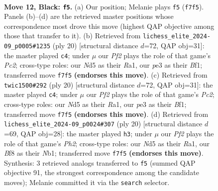 \documentclass[11pt]{article}
\begin{document}
\clearpage

\begin{figure}[p]\centering
\begin{subfigure}{0.46\textwidth}\centering
\resizebox{\linewidth}{!}{%
\newchessgame
\chessboard[
  setfen={r1bk1b1r/ppq2ppp/2p1p3/3nN3/3P4/1Q1BP3/PP3PPP/R1B1K2R b KQ - 5 12},
  showmover=false,
  pgfstyle=straightmove, color=movearrow, markmove={f7-f5}
]}
\caption{}
\end{subfigure}\hfill
\begin{subfigure}{0.46\textwidth}\centering
\resizebox{\linewidth}{!}{%
\newchessgame
\chessboard[
  setfen={r1b1k2r/p2pbppp/1qp1p3/3nP3/4NP2/P7/1PP3PP/R1BQKB1R w KQkq - 1 11},
  showmover=false,
  pgfstyle=straightmove, color=movearrow, markmove={c2-c4}
]}
\caption{}
\end{subfigure}
\\[4pt]
\begin{subfigure}{0.46\textwidth}\centering
\resizebox{\linewidth}{!}{%
\newchessgame
\chessboard[
  setfen={r1b1k2r/p2pbppp/1qp1p3/3nP3/4NP2/P7/1PP3PP/R1BQKB1R w KQkq - 1 11},
  showmover=false,
  pgfstyle=straightmove, color=movearrow, markmove={c2-c4}
]}
\caption{}
\end{subfigure}\hfill
\begin{subfigure}{0.46\textwidth}\centering
\resizebox{\linewidth}{!}{%
\newchessgame
\chessboard[
  setfen={r1b1k2r/ppp2pp1/1bp2q2/7p/3PP1n1/2P2BP1/PP3P1P/RNBQK2R w KQkq - 3 11},
  showmover=false,
  pgfstyle=straightmove, color=movearrow, markmove={h2-h3}
]}
\caption{}
\end{subfigure}
\caption{\textbf{Move 12, Black: \texttt{f5}.} (a) Our position; Melanie plays \texttt{f5} (\texttt{f7f5}). Panels (b)--(d) are the retrieved master positions whose correspondence most drove this move (highest QAP objective among those that transfer to it). (b) Retrieved from \texttt{lichess\_elite\_2024-09\_p0005\#1235} (ply 20) [structural distance $d$=72, QAP obj=31]: the master played \texttt{c4}; under $\mu$ our \emph{Pf2} plays the role of that game's \emph{Pc2}; cross-type roles: our \emph{N}d5 as their \emph{R}a1, our \emph{p}e3 as their \emph{B}f1; transferred move \texttt{f7f5} \textbf{(endorses this move)}. (c) Retrieved from \texttt{twic1500\#292} (ply 20) [structural distance $d$=72, QAP obj=31]: the master played \texttt{c4}; under $\mu$ our \emph{Pf2} plays the role of that game's \emph{Pc2}; cross-type roles: our \emph{N}d5 as their \emph{R}a1, our \emph{p}e3 as their \emph{B}f1; transferred move \texttt{f7f5} \textbf{(endorses this move)}. (d) Retrieved from \texttt{lichess\_elite\_2024-09\_p0024\#307} (ply 20) [structural distance $d$=69, QAP obj=28]: the master played \texttt{h3}; under $\mu$ our \emph{Pf2} plays the role of that game's \emph{Ph2}; cross-type roles: our \emph{N}d5 as their \emph{R}a1, our \emph{B}f8 as their \emph{N}b1; transferred move \texttt{f7f5} \textbf{(endorses this move)}. Synthesis: 3 retrieved analogs transferred to \texttt{f5} (summed QAP objective 91, the strongest correspondence among the candidate moves); Melanie committed it via the \texttt{search} selector.}
\label{fig:thought-m23}
\end{figure}
\end{document}
